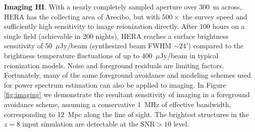 \documentclass[preprint]{aastex}
\newcommand{\compress}{\vspace{-0.3in}}
\newcommand{\Caption}[4]{\vspace{#1}\renewcommand{\baselinestretch}{#2}\caption{#4}\vspace{#3}}
\begin{document}
{\bf Imaging HI}. With a nearly completely sampled aperture over 300~m across, HERA has the collecting area of Arecibo, but
with $500\times$ the survey speed and sufficiently high sensitivity to image reionization directly.  After 100 hours on a
single field (achievable in 200 nights), HERA reaches a surface brightness sensitivity
of 50~$\mu$Jy/beam (synthesized beam FWHM $\sim 24'$) compared to the brightness temperature fluctuations of up to 400~$\mu$Jy/beam in typical reionization models.
Noise and foreground residuals are limiting factors.  Fortunately, many of the same foreground avoidance and modeling schemes used for power spectrum estimation can also be applied to imaging.  In Figure \ref{fig:imaging} we demonstrate the
resultant sensitivity of imaging in a foreground avoidance scheme, assuming a conservative 1~MHz of effective bandwidth, corresponding to 12~Mpc along the line of
sight.  The brightest structures in the $z=8$ input simulation are detectable at the SNR$>10$ level.

\end{document}
